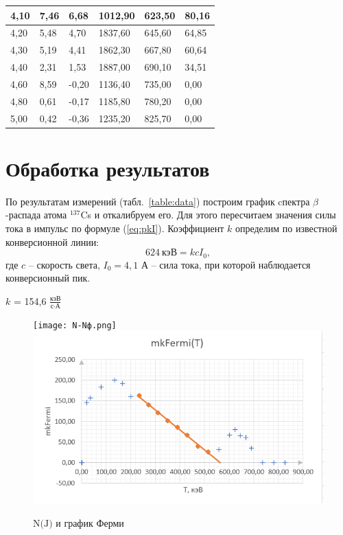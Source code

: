 \documentclass[a4paper, 12pt]{article}
\begin{document}
\begin{table}[h]
\begin{tabular}{|l|l|l|l|l|l|}
        4,10 & 7,46 & 6,68 & 1012,90 & 623,50 & 80,16 \\ \hline
        4,20 & 5,48 & 4,70 & 1837,60 & 645,60 & 64,85 \\ \hline
        4,30 & 5,19 & 4,41 & 1862,30 & 667,80 & 60,64 \\ \hline
        4,40 & 2,31 & 1,53 & 1887,00 & 690,10 & 34,51 \\ \hline
        4,60 & 8,59 & -0,20 & 1136,40 & 735,00 & 0,00 \\ \hline
        4,80 & 0,61 & -0,17 & 1185,80 & 780,20 & 0,00 \\ \hline
        5,00 & 0,42 & -0,36 & 1235,20 & 825,70 & 0,00 \\ \hline
    \end{tabular}
        \end{table}
	

	\section*{Обработка результатов}
		По результатам измерений (табл.~\ref{table:data}) построим график cпектра $\beta$-распада атома $^{137}$Cs и откалибруем его. Для этого пересчитаем значения силы тока в импульс по формуле (\ref{eq:pkI}). Коэффициент $k$ определим по известной конверсионной линии:
			$$624 \ \text{кэВ} = kcI_0,$$
		где $c$ -- скорость света, $I_0 = 4,1$ А -- сила тока, при которой наблюдается конверсионный пик.

            \begin{center}
            $k$ = 154,6 $\frac{\text{кэВ}}{{\text{с}} \cdot {\text{А}}}$
            \end{center}
  
	\begin{figure}[h]
		\centering
            \texttt{[image: N-Nф.png]}
            \includegraphics[width=12cm]{mkFermi.png}
            \caption{$\text{N(J)}$ и график Ферми}
        \end{figure}
\end{document}
